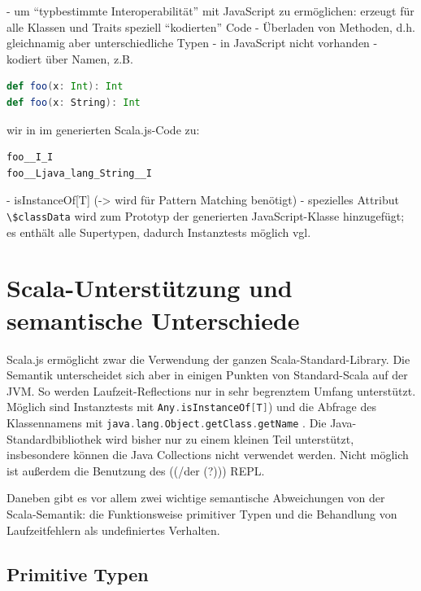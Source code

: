 \documentclass[a4paper, 12pt, hidelinks, listof=totoc, listoftables=totoc, bibliography=totoc]{scrreprt}
\newcommand{\code}[1]{\lstinline[language=Scala, style=inline]|#1|}
\newcommand{\scala}[1]{\lstinline[language=Scala, style=inline]|#1|}
\begin{document}
- um "`typbestimmte Interoperabilität"'\cite{doeraene2013.TDI} mit JavaScript zu ermöglichen: erzeugt für alle Klassen und Traits speziell "`kodierten"' Code
- Überladen von Methoden, d.h. gleichnamig aber unterschiedliche Typen
	- in JavaScript nicht vorhanden
	- kodiert über Namen, z.B.
\begin{lstlisting}[language=Scala]
def foo(x: Int): Int
def foo(x: String): Int
\end{lstlisting}
wir in im generierten Scala.js-Code zu:
\begin{lstlisting}[language=JavaScript]
foo__I_I
foo__Ljava_lang_String__I
\end{lstlisting}
	
- isInstanceOf[T] (-> wird für Pattern Matching benötigt)
	- spezielles Attribut \code{\$classData} wird zum Prototyp der generierten JavaScript-Klasse hinzugefügt; es enthält alle Supertypen, dadurch Instanztests möglich
vgl. \cite[S. 3 f.]{doeraene2013.TDI}







\section{Scala-Unterstützung und semantische Unterschiede}

Scala.js ermöglicht zwar die Verwendung der ganzen Scala-Standard-Library. Die Semantik unterscheidet sich aber in einigen Punkten von Standard-Scala auf der JVM. So werden Laufzeit-Reflections nur in sehr begrenztem Umfang unterstützt. Möglich sind Instanztests mit \scala{Any.isInstanceOf[T]}) \cite[S. 2 f.]{doeraene2013.TDI} und die Abfrage des Klassennamens mit \scala{java.lang.Object.getClass.getName} \cite{scalajs.DSS}. Die Java-Standardbibliothek wird bisher nur zu einem kleinen Teil unterstützt\cite{doeraene2014.WHB}, insbesondere können die Java Collections nicht verwendet werden. Nicht möglich ist außerdem die Benutzung des ((/der (?))) REPL\cite{doeraene2013.CSJ}.

Daneben gibt es vor allem zwei wichtige semantische Abweichungen von der Scala-Semantik: die Funktionsweise primitiver Typen und die Behandlung von Laufzeitfehlern als undefiniertes Verhalten.


\subsection{Primitive Typen}
\end{document}
